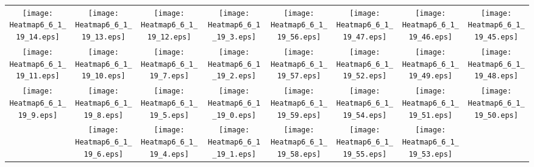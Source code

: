 \documentclass{standalone}
\begin{document}
\begin{tabular}{ *8{c} }
\texttt{[image: Heatmap6\_6\_1\_19\_14.eps]} & \texttt{[image: Heatmap6\_6\_1\_19\_13.eps]} & \texttt{[image: Heatmap6\_6\_1\_19\_12.eps]} & \texttt{[image: Heatmap6\_6\_1\_19\_3.eps]} & \texttt{[image: Heatmap6\_6\_1\_19\_56.eps]} & \texttt{[image: Heatmap6\_6\_1\_19\_47.eps]} & \texttt{[image: Heatmap6\_6\_1\_19\_46.eps]} & \texttt{[image: Heatmap6\_6\_1\_19\_45.eps]} \\
\texttt{[image: Heatmap6\_6\_1\_19\_11.eps]} & \texttt{[image: Heatmap6\_6\_1\_19\_10.eps]} & \texttt{[image: Heatmap6\_6\_1\_19\_7.eps]} & \texttt{[image: Heatmap6\_6\_1\_19\_2.eps]} & \texttt{[image: Heatmap6\_6\_1\_19\_57.eps]} & \texttt{[image: Heatmap6\_6\_1\_19\_52.eps]} & \texttt{[image: Heatmap6\_6\_1\_19\_49.eps]} & \texttt{[image: Heatmap6\_6\_1\_19\_48.eps]} \\
\texttt{[image: Heatmap6\_6\_1\_19\_9.eps]} & \texttt{[image: Heatmap6\_6\_1\_19\_8.eps]} & \texttt{[image: Heatmap6\_6\_1\_19\_5.eps]} & \texttt{[image: Heatmap6\_6\_1\_19\_0.eps]} & \texttt{[image: Heatmap6\_6\_1\_19\_59.eps]} & \texttt{[image: Heatmap6\_6\_1\_19\_54.eps]} & \texttt{[image: Heatmap6\_6\_1\_19\_51.eps]} & \texttt{[image: Heatmap6\_6\_1\_19\_50.eps]} \\
 & \texttt{[image: Heatmap6\_6\_1\_19\_6.eps]} & \texttt{[image: Heatmap6\_6\_1\_19\_4.eps]} & \texttt{[image: Heatmap6\_6\_1\_19\_1.eps]} & \texttt{[image: Heatmap6\_6\_1\_19\_58.eps]} & \texttt{[image: Heatmap6\_6\_1\_19\_55.eps]} & \texttt{[image: Heatmap6\_6\_1\_19\_53.eps]} &  
\end{tabular}
\end{document}
